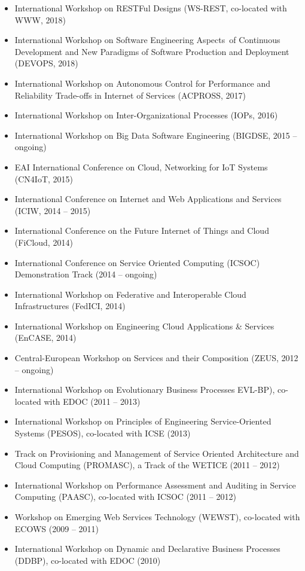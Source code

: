 \documentclass[paper=letter,fontsize=11pt]{scrartcl} %
\begin{document}
\begin{itemize}
	\item International Workshop on RESTFul Designs (WS-REST, co-located with WWW, 2018)
	\item International Workshop on Software Engineering Aspects of Continuous Development and New Paradigms of Software Production and Deployment (DEVOPS, 2018)
  \item International Workshop on Autonomous Control for Performance and Reliability Trade-offs in Internet of Services (ACPROSS, 2017)
	\item International Workshop on Inter-Organizational Processes (IOPs, 2016)
    \item  International Workshop on Big Data Software Engineering (BIGDSE, 2015 -- ongoing)
  \item EAI International Conference on Cloud, Networking for IoT Systems (CN4IoT, 2015)
  \item International Conference on Internet and Web Applications and Services (ICIW, 2014 -- 2015)
  \item International Conference on the Future Internet of Things and Cloud (FiCloud, 2014)
    \item International Conference on Service Oriented Computing (ICSOC) Demonstration Track (2014 -- ongoing)
    \item International Workshop on Federative and Interoperable Cloud Infrastructures (FedICI, 2014)
    \item International Workshop on Engineering Cloud Applications \& Services (EnCASE, 2014)
  \item Central-European Workshop on Services and their Composition (ZEUS, 2012 -- ongoing)
  \item International Workshop on Evolutionary Business Processes EVL-BP), co-located with EDOC (2011 -- 2013)
  \item International Workshop on Principles of Engineering Service-Oriented Systems (PESOS), co-located with ICSE (2013)
  \item Track on Provisioning and Management of Service Oriented Architecture and Cloud Computing (PROMASC), a Track of the WETICE (2011 -- 2012)
  \item International Workshop on Performance Assessment and Auditing in Service Computing (PAASC), co-located with ICSOC (2011 -- 2012)
  \item Workshop on Emerging Web Services Technology (WEWST), co-located
  with ECOWS (2009 -- 2011)
  \item International Workshop on Dynamic and Declarative Business
  Processes (DDBP), co-located with EDOC (2010)
\end{itemize}
\end{document}
